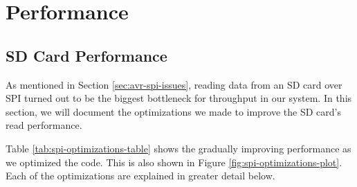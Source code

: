 \section{Performance}

\subsection{SD Card Performance}
\label{sec:performance-sd-card}

As mentioned in Section \ref{sec:avr-spi-issues}, reading data from an
SD card over SPI turned out to be the biggest bottleneck for throughput
in our system. In this section, we will document the optimizations we
made to improve the SD card's read performance.

Table \ref{tab:spi-optimizations-table} shows the gradually improving
performance as we optimized the code. This is also shown in Figure
\ref{fig:spi-optimizations-plot}. Each of the optimizations are
explained in greater detail below.

